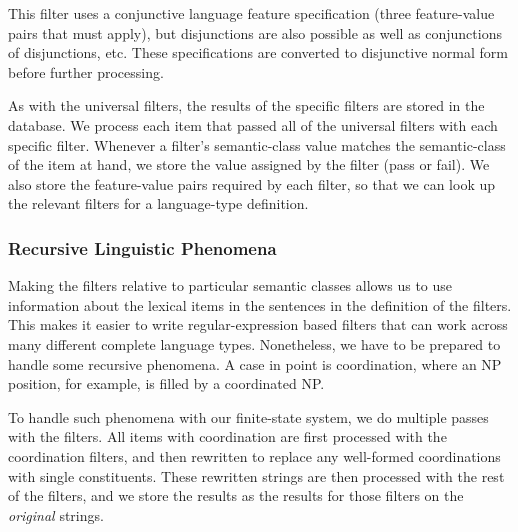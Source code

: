 \documentclass[11pt]{article}
\begin{document}
%
This filter uses a conjunctive language feature specification
(three feature-value pairs that must apply), but disjunctions are
also possible as well as conjunctions of disjunctions, etc.  These
specifications are converted to disjunctive normal form before
further processing.

As with the universal filters, the results of the specific filters are
stored in the database.  We process each item that passed all of the
universal filters with each specific filter.  Whenever a filter's
semantic-class value matches the semantic-class of the item at hand,
we store the value assigned by the filter (pass or fail).  We also
store the feature-value pairs required by each filter, so that we can
look up the relevant filters for a language-type definition.


\subsubsection{Recursive Linguistic Phenomena}

Making the filters relative to particular semantic classes
allows us to use information about the lexical items in 
the sentences in the definition of the filters.  This makes
it easier to write regular-expression based filters that
can work across many different complete language types. Nonetheless,
we have to be prepared to handle some recursive phenomena.
A case in point is coordination, where an NP position, for example,
is filled by a coordinated NP.  

To handle such phenomena with our finite-state system, we do multiple
passes with the filters.  All items with coordination are first processed
with the coordination filters, and then rewritten to replace any
well-formed coordinations with single constituents.  These rewritten
strings are then processed with the rest of the filters, and we store
the results as the results for those filters on the {\it original}
strings.
\end{document}
